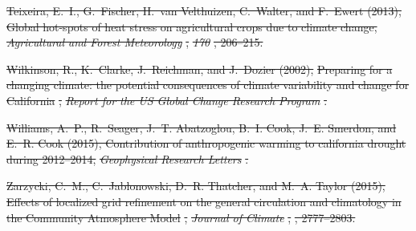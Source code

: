 \documentclass[draft,ms]{agutex}   %
\providecommand{\DIFdel}[1]{{\protect\color{red}\sout{#1}}}                      %
\providecommand{\DIFdelend}{} %
\begin{document}
\begin{article}
\DIFdel{Teixeira, E.~I., G.~Fischer, H.~van Velthuizen, C.~Walter, and F.~Ewert (2013),
  Global hot-spots of heat stress on agricultural crops due to climate change,
  }\textit{\DIFdel{Agricultural and Forest Meteorology}}%
\DIFdel{, }\textit{\DIFdel{170}}%
\DIFdel{, 206--215.
}%

\DIFdel{Wilkinson, R., K.~Clarke, J.~Reichman, and J.~Dozier (2002), }%
\DIFdel{Preparing for a
  changing climate: the potential consequences of climate variability and
  change for California}%
\DIFdel{, }\textit{\DIFdel{Report for the US Global Change Research
  Program}}%
\DIFdel{.
}%

\DIFdel{Williams, A.~P., R.~Seager, J.~T. Abatzoglou, B.~I. Cook, J.~E. Smerdon, and
  E.~R. Cook (2015), Contribution of anthropogenic warming to california
  drought during 2012--2014, }\textit{\DIFdel{Geophysical Research Letters}}%
\DIFdel{.
}%

\DIFdel{Zarzycki, C.~M., C.~Jablonowski, D.~R. Thatcher, and M.~A. Taylor (2015),
  }%
\DIFdel{Effects of localized grid refinement on the general circulation and
  climatology in the Community Atmosphere Model}%
\DIFdel{, }\textit{\DIFdel{Journal of Climate}}%
\DIFdel{,
  }%
\DIFdel{, 2777--2803.
}%


\DIFdelend \end{article}


\clearpage
\end{document}
